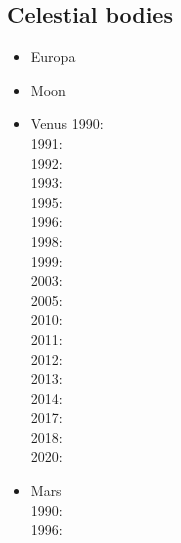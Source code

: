 {\scriptsize
\noindent
\cite{laqu86}
\cite{rotf90}
\cite{frha93}
\cite{elgo94}
\cite{cheb96}\cite{elma96}
\cite{brpv97}
\cite{lixu01}
\cite{dogs06}\cite{lica06}
\cite{hoow17}
}

\subsection{Celestial bodies}

\begin{itemize}
\item Europa 
{\scriptsize
\cite{shha04,shha05,mish05,hash08}\cite{hash10}\cite{hash11,kast14,almc19}
}
\item Moon 
{\scriptsize
\cite{elvh02}\cite{elhg04}\cite{devv10}\cite{dejv13} \cite{zhdv19}
} 
\item Venus 
{\scriptsize
1990: \cite{scbg90}\\
1991: \cite{lekb91}\\
1992: \cite{kiha92,sqjs92}\\
1993: \cite{kief93,lekb93}\\
1995: \cite{lekb95,mopa95}\\
1996: \cite{somo96}\\
1998: \cite{mazk98}\cite{resm98}\cite{moso98}\cite{phha98}\\
1999: \cite{resm99}\\
2003: \cite{vesh03}\\
2005: \cite{vavv05}\\
2010: \cite{stfh10}\\
2011: \cite{orso11}\\
2012: \cite{arta12}\\
2013: \cite{huyz13}\\
2014: \cite{gita14}\cite{gery14b}\\
2017: \cite{cram17}\cite{dast17}\\
2018: \cite{king18}\\
2020: \cite{weki20}
}
\item Mars \\
{\scriptsize
1990: \cite{scbg90}\\
1996: \cite{hach96}\\
}
\end{itemize}
